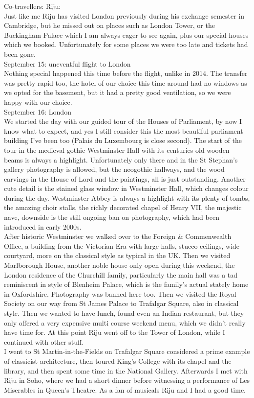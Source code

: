 Co-travellers: Riju:\\
Just like me Riju has visited London previously during his exchange semester in Cambridge, but he missed out on places such as London Tower, or the Buckingham Palace which I am always eager to see again, plus our special houses which we booked. Unfortunately for some places we were too late and tickets had been gone.\\

September 15: uneventful flight to London\\
Nothing special happened this time before the flight, unlike in 2014. The transfer was pretty rapid too, the hotel of our choice this time around had no windows as we opted for the basement, but it had a pretty good ventilation, so we were happy with our choice.\\

September 16: London\\
We started the day with our guided tour of the Houses of Parliament, by now I know what to expect, and yes I still consider this the most beautiful parliament building I've been too (Palais du Luxembourg is close second). The start of the tour in the medieval gothic Westminster Hall with its centuries old wooden beams is always a highlight. Unfortunately only there and in the St Stephan's gallery photography is allowed, but the neogothic hallways, and the wood carvings in the House of Lord and the paintings, all is just outstanding. Another cute detail is the stained glass window in Westminster Hall, which changes colour during the day. Westminster Abbey is always a highlight with its plenty of tombs, the amazing choir stalls, the richly decorated chapel of Henry VII, the majestic nave, downside is the still ongoing ban on photography, which had been introduced in early 2000s.\\
After historic Westminster we walked over to the Foreign \& Commenwealth Office, a building from the Victorian Era with large halls, stucco ceilings, wide courtyard, more on the classical style as typical in the UK. Then we visited Marlborough House, another noble house only open during this weekend, the London residence of the Churchill family, particularly the main hall was a tad reminiscent in style of Blenheim Palace, which is the family's actual stately home in Oxfordshire. Photography was banned here too. Then we visited the Royal Society on our way from St James Palace to Trafalgar Square, also in classical style. Then we wanted to have lunch, found even an Indian restaurant, but they only offered a very expensive multi course weekend menu, which we didn't really have time for. At this point Riju went off to the Tower of London, while I continued with other stuff.  \\
I went to St Martin-in-the-Fields on Trafalgar Square considered a prime example of classicist architecture, then toured King's College with its chapel and the library, and then spent some time in the National Gallery. Afterwards I met with Riju in Soho, where we had a short dinner before witnessing a performance of Les Miserables in Queen's Theatre. As a fan of musicals Riju and I had a good time.\\

